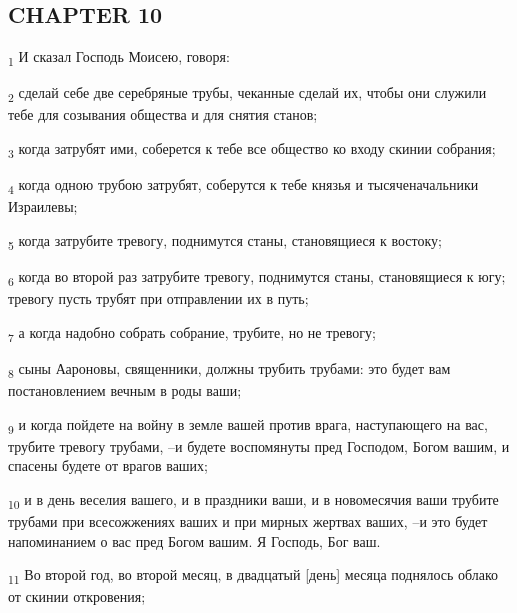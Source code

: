 \subsection{CHAPTER 10}
\begin{tcolorbox}
\textsubscript{1} И сказал Господь Моисею, говоря:
\end{tcolorbox}
\begin{tcolorbox}
\textsubscript{2} сделай себе две серебряные трубы, чеканные сделай их, чтобы они служили тебе для созывания общества и для снятия станов;
\end{tcolorbox}
\begin{tcolorbox}
\textsubscript{3} когда затрубят ими, соберется к тебе все общество ко входу скинии собрания;
\end{tcolorbox}
\begin{tcolorbox}
\textsubscript{4} когда одною трубою затрубят, соберутся к тебе князья и тысяченачальники Израилевы;
\end{tcolorbox}
\begin{tcolorbox}
\textsubscript{5} когда затрубите тревогу, поднимутся станы, становящиеся к востоку;
\end{tcolorbox}
\begin{tcolorbox}
\textsubscript{6} когда во второй раз затрубите тревогу, поднимутся станы, становящиеся к югу; тревогу пусть трубят при отправлении их в путь;
\end{tcolorbox}
\begin{tcolorbox}
\textsubscript{7} а когда надобно собрать собрание, трубите, но не тревогу;
\end{tcolorbox}
\begin{tcolorbox}
\textsubscript{8} сыны Аароновы, священники, должны трубить трубами: это будет вам постановлением вечным в роды ваши;
\end{tcolorbox}
\begin{tcolorbox}
\textsubscript{9} и когда пойдете на войну в земле вашей против врага, наступающего на вас, трубите тревогу трубами, --и будете воспомянуты пред Господом, Богом вашим, и спасены будете от врагов ваших;
\end{tcolorbox}
\begin{tcolorbox}
\textsubscript{10} и в день веселия вашего, и в праздники ваши, и в новомесячия ваши трубите трубами при всесожжениях ваших и при мирных жертвах ваших, --и это будет напоминанием о вас пред Богом вашим. Я Господь, Бог ваш.
\end{tcolorbox}
\begin{tcolorbox}
\textsubscript{11} Во второй год, во второй месяц, в двадцатый [день] месяца поднялось облако от скинии откровения;
\end{tcolorbox}
